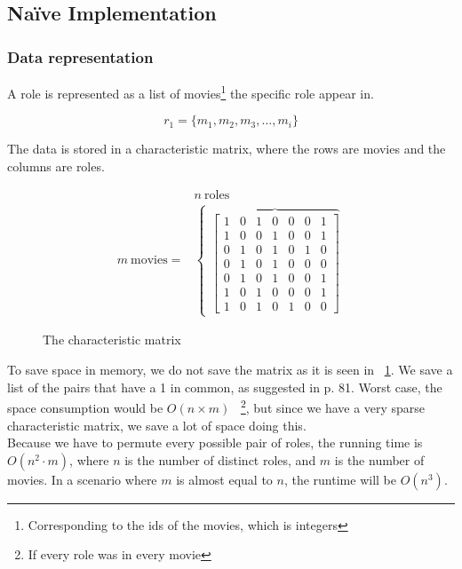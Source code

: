 \documentclass[a4paper,11pt]{article}
\begin{document}
\subsection{Naïve Implementation}

\subsubsection{Data representation}
A role is represented as a list of movies\footnote{Corresponding to the ids of the movies, which is integers} the specific role appear in.

\begin{equation}
r_1 = \{m_1, m_2, m_3, \ldots , m_i\}
\end{equation}

The data is stored in a characteristic matrix, where the rows are movies and the columns are roles.

\begin{figure}[!htbp]
\begin{eqnarray*}
 & n \ \text{roles} \\
 m \ \text{movies} = & 
\begin{cases}
    \overbrace{
    \begin{bmatrix}
        1 & 0 & 1 & 0 & 0 & 0 & 1\\
        1 & 0 & 0 & 1 & 0 & 0 & 1\\
        0 & 1 & 0 & 1 & 0 & 1 & 0\\
        0 & 1 & 0 & 1 & 0 & 0 & 0\\
        0 & 1 & 0 & 1 & 0 & 0 & 1\\
        1 & 0 & 1 & 0 & 0 & 0 & 1\\
        1 & 0 & 1 & 0 & 1 & 0 & 0
    \end{bmatrix} 
    }
\end{cases}
\end{eqnarray*}
\caption{The characteristic matrix}
\label{fig:char_matrix}
\end{figure}

To save space in memory, we do not save the matrix as it is seen in ~\ref{fig:char_matrix}. We save a list of the pairs that have a 1 in common, as suggested in \cite{book:mmds} p. 81. Worst case, the space consumption would be $O(n \times m)$ \ \footnote{If every role was in every movie}, but since we have a very sparse characteristic matrix, we save a lot of space doing this. \\

Because we have to permute every possible pair of roles, the running time is $O(n^2 \cdot m)$, where $n$ is the number of distinct roles, and $m$ is the number of movies. In a scenario where $m$ is almost equal to $n$, the runtime will be $O(n^3)$. \\
\end{document}
